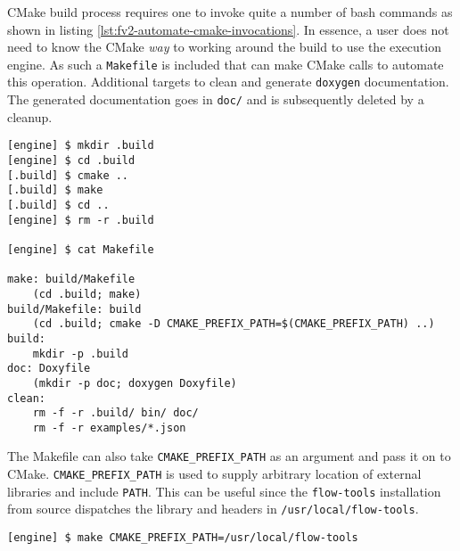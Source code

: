 CMake build process requires one to invoke quite a number of bash commands as
shown in listing \ref{lst:fv2-automate-cmake-invocations}. In essence, a user
does not need to know the CMake \emph{way} to working around the build to use
the execution  engine. As such a
\texttt{Makefile} is included that can make CMake calls to automate this
operation. Additional targets to clean and generate \texttt{doxygen}
documentation. The generated documentation goes in \texttt{doc/} and is
subsequently deleted by a cleanup.

\begin{lstlisting}
[engine] $ mkdir .build
[engine] $ cd .build
[.build] $ cmake ..
[.build] $ make
[.build] $ cd ..
[engine] $ rm -r .build

[engine] $ cat Makefile

make: build/Makefile
    (cd .build; make)
build/Makefile: build
    (cd .build; cmake -D CMAKE_PREFIX_PATH=$(CMAKE_PREFIX_PATH) ..)
build:
    mkdir -p .build
doc: Doxyfile
    (mkdir -p doc; doxygen Doxyfile)
clean:
    rm -f -r .build/ bin/ doc/
    rm -f -r examples/*.json
\end{lstlisting}

The Makefile can also take \texttt{CMAKE\_PREFIX\_PATH} as an argument and
pass it on to CMake. \texttt{CMAKE\_PREFIX\_PATH} is used to supply arbitrary
 location of external libraries and include
\texttt{PATH}. This can be useful since the \texttt{flow-tools} installation
from source dispatches the library and headers in
\texttt{/usr/local/flow-tools}.

\begin{lstlisting}
[engine] $ make CMAKE_PREFIX_PATH=/usr/local/flow-tools
\end{lstlisting}
